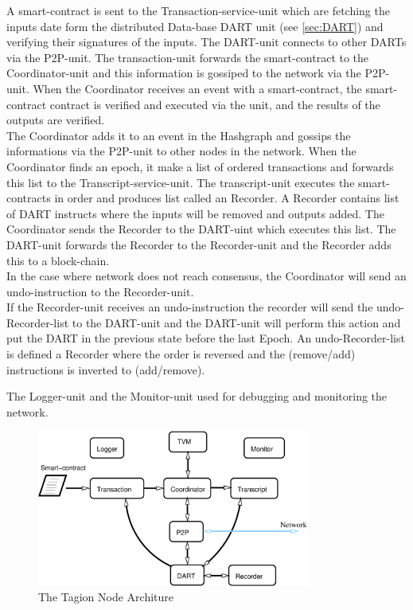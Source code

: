 A smart-contract is sent to the Transaction-service-unit which are fetching the inputs date form the distributed Data-base DART unit (see \cref{sec:DART}) and verifying their signatures of the inputs. The DART-unit connects to other DARTs via the P2P-unit. The transaction-unit forwards the smart-contract to the Coordinator-unit and this information is gossiped to the network via the P2P-unit.
When the Coordinator receives an event with a smart-contract, the smart-contract contract is verified and executed via the  unit, and the results of the outputs are verified.\\
The Coordinator adds it to an event in the Hashgraph and gossips the informations via the P2P-unit to other nodes in the network.    
When the Coordinator finds an epoch, it make a list of ordered transactions and forwards this list to the Transcript-service-unit. The transcript-unit executes the smart-contracts in order and produces list called an Recorder. A Recorder contains list of DART instructs where the inputs will be removed and outputs added. The Coordinator sends the Recorder to the DART-uint which executes this list. The DART-unit forwards the Recorder to the Recorder-unit and the Recorder adds this to a block-chain.\\
In the case where network does not reach consensus, the Coordinator will send an undo-instruction to the Recorder-unit.\\
If the Recorder-unit receives an undo-instruction the recorder will send the undo-Recorder-list to the DART-unit and the DART-unit will perform this action and put the DART in the previous state before the last Epoch.
An undo-Recorder-list is defined a Recorder where the order is reversed and the (remove/add) instructions is inverted to (add/remove).

The Logger-unit and the Monitor-unit used for debugging and monitoring the network.

\begin{figure}[H]
	\centering
	\includegraphics[width=0.8\textwidth]{fig/node_service.eps}
	\caption{The Tagion Node Architure}
	\label{fig:node_service}
\end{figure}


